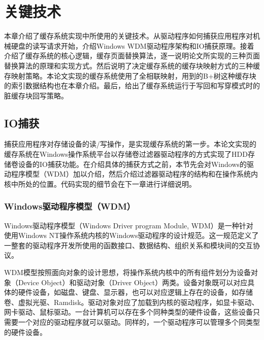 
\chapter{关键技术}
\label{cha:key_tech}

本章介绍了缓存系统实现中所使用的关键技术。从驱动程序如何捕获应用程序对机械硬盘的读写请求开始，介绍Windows WDM驱动程序架构和IO捕获原理。接着介绍了缓存系统的核心逻辑，缓存页面替换算法，逐一说明论文所实现的三种页面替换算法的原理和实现方式。然后说明了决定缓存系统的缓存块映射方式的三种缓存映射策略。本论文实现的缓存系统使用了全相联映射，用到的B+树这种缓存块的索引数据结构也在本章介绍。最后，给出了缓存系统运行于写回和写穿模式时的脏缓存块回写策略。

\section{IO捕获}
\label{sec:capture_io}

捕获应用程序对存储设备的读/写操作，是实现缓存系统的第一步。本论文实现的缓存系统在Windows操作系统平台以存储卷过滤器驱动程序的方式实现了HDD存储卷设备的IO捕获功能。在介绍具体的捕获方式之前，本节先会对Windows的驱动程序模型（WDM）加以介绍，然后介绍过滤器驱动程序的结构和在操作系统内核中所处的位置。代码实现的细节会在下一章进行详细说明。

\subsection{Windows驱动程序模型（WDM）}
Windows驱动程序模型（Windows Driver program Module, WDM）是一种针对使用Windows NT操作系统内核的Windows驱动程序的设计规范\cite{wdm2001}。这一规范定义了一整套的驱动程序开发所使用的函数接口、数据结构、组织关系和模块间的交互协议。

WDM模型按照面向对象的设计思想，将操作系统内核中的所有组件划分为设备对象（Device Object）和驱动对象（Driver Object）两类。设备对象既可以对应具体的硬件设备，如磁盘、键盘、显示器，也可以对应逻辑上存在的设备，如存储卷、虚拟光驱、Ramdisk。驱动对象对应了加载到内核的驱动程序，如显卡驱动、网卡驱动、鼠标驱动。一台计算机可以存在多个同种类型的硬件设备，这些设备只需要一个对应的驱动程序就可以驱动。同样的，一个驱动程序可以管理多个同类型的硬件设备。

